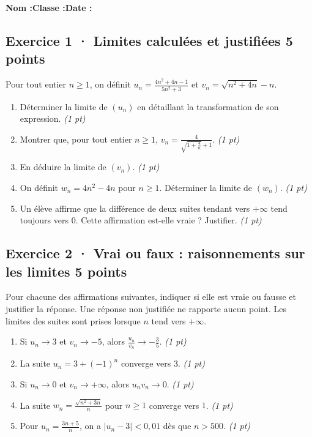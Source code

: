 \smallskip\textbf{Nom :}\enspace\dotfill\quad\textbf{Classe :}\enspace\dotfill\quad\textbf{Date :}\enspace\dotfill

\subsection*{Exercice 1 · Limites calculées et justifiées \hfill 5 points}Pour tout entier $n\ge1$, on définit $u_n=\frac{4n^2+4n-1}{5n^2+3}$ et $v_n=\sqrt{n^2+4n}-n$.

\begin{enumerate}

\item Déterminer la limite de $(u_n)$ en détaillant la transformation de son expression. \hfill\textit{(1 pt)}

\item Montrer que, pour tout entier $n\ge1$, $v_n=\frac{4}{\sqrt{1+\frac{4}n}+1}$. \hfill\textit{(1 pt)}

\item En déduire la limite de $(v_n)$. \hfill\textit{(1 pt)}

\item On définit $w_n=4n^2-4n$ pour $n\ge1$. Déterminer la limite de $(w_n)$. \hfill\textit{(1 pt)}

\item Un élève affirme que la différence de deux suites tendant vers $+\infty$ tend toujours vers $0$. Cette affirmation est-elle vraie ? Justifier. \hfill\textit{(1 pt)}

\end{enumerate}

\subsection*{Exercice 2 · Vrai ou faux : raisonnements sur les limites \hfill 5 points}Pour chacune des affirmations suivantes, indiquer si elle est vraie ou fausse et justifier la réponse. Une réponse non justifiée ne rapporte aucun point. Les limites des suites sont prises lorsque $n$ tend vers $+\infty$.

\begin{enumerate}

\item Si $u_n\to 3$ et $v_n\to-5$, alors $\frac{u_n}{v_n}\to-\frac{3}{5}$. \hfill\textit{(1 pt)}

\item La suite $u_n=3+(-1)^n$ converge vers $3$. \hfill\textit{(1 pt)}

\item Si $u_n\to0$ et $v_n\to+\infty$, alors $u_nv_n\to0$. \hfill\textit{(1 pt)}

\item La suite $w_n=\frac{\sqrt{n^2+3n}}{n}$ pour $n\ge1$ converge vers $1$. \hfill\textit{(1 pt)}

\item Pour $u_n=\frac{3n+5}{n}$, on a $|u_n-3|<0{,}01$ dès que $n> 500$. \hfill\textit{(1 pt)}

\end{enumerate}

